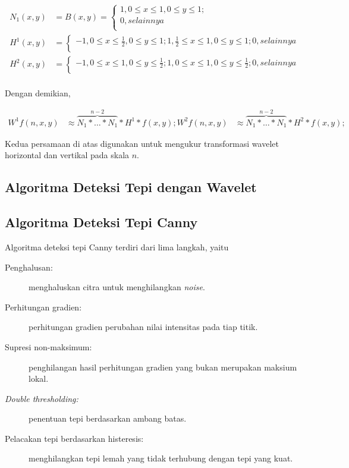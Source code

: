 \documentclass[laporan.tex]{subfiles}
\begin{document}
\begin{align}
	N_1(x,y) & = B(x,y) = \begin{cases}
		1, 0 \leq x \leq 1, 0 \leq y \leq 1; \\
		0, selainnya \\
	\end{cases} \\
	H^1(x,y) & = \begin{cases}
		-1, 0 \leq x \leq \frac{1}{2}, 0 \leq y \leq 1;
		1, \frac{1}{2} \leq x \leq 1, 0 \leq y \leq 1;
		0, selainnya \\
	\end{cases} \\
	H^2(x,y) & = \begin{cases}
		-1, 0 \leq x \leq 1, 0 \leq y \leq \frac{1}{2};
		1, 0 \leq x \leq 1, 0 \leq y \leq \frac{1}{2};
		0, selainnya \\
	\end{cases} \\
\end{align}

Dengan demikian,

\begin{align}
	W^1f(n,x,y) & \approx \overbrace{N_1 \ast \ldots \ast N_1}^{n-2} \ast H^1 \ast f(x,y);
	W^2f(n,x,y) & \approx \overbrace{N_1 \ast \ldots \ast N_1}^{n-2} \ast H^2 \ast f(x,y);
\end{align}

Kedua persamaan di atas digunakan untuk mengukur transformasi wavelet horizontal dan vertikal pada skala $n$.

\subsection{Algoritma Deteksi Tepi dengan Wavelet}

\subsection{Algoritma Deteksi Tepi Canny}

Algoritma deteksi tepi Canny terdiri dari lima langkah, yaitu

\begin{description}
\item [Penghalusan:] menghaluskan citra untuk menghilangkan \emph{noise}.
\item [Perhitungan gradien:] perhitungan gradien perubahan nilai intensitas pada tiap titik.
\item [Supresi non-maksimum:] penghilangan hasil perhitungan gradien yang bukan merupakan maksium lokal.
\item [\emph{Double thresholding:}] penentuan tepi berdasarkan ambang batas.
\item [Pelacakan tepi berdasarkan histeresis:] menghilangkan tepi lemah yang tidak terhubung dengan tepi yang kuat.
\end{description}
\end{document}
